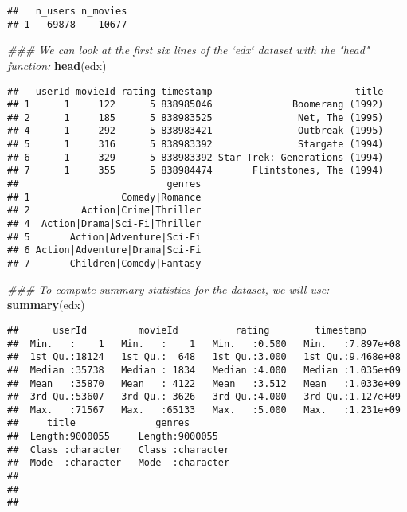 \documentclass[]{article}
\newenvironment{Shaded}{\begin{snugshade}}{\end{snugshade}}
\newcommand{\CommentTok}[1]{\textcolor[rgb]{0.56,0.35,0.01}{\textit{#1}}}
\newcommand{\DataTypeTok}[1]{\textcolor[rgb]{0.13,0.29,0.53}{#1}}
\newcommand{\KeywordTok}[1]{\textcolor[rgb]{0.13,0.29,0.53}{\textbf{#1}}}
\newcommand{\NormalTok}[1]{#1}
\newcommand{\OperatorTok}[1]{\textcolor[rgb]{0.81,0.36,0.00}{\textbf{#1}}}
\begin{document}
\begin{Shaded}
\end{Shaded}

\begin{verbatim}
##   n_users n_movies
## 1   69878    10677
\end{verbatim}

\begin{Shaded}
\begin{Highlighting}[]
\CommentTok{### We can look at the first six lines of the `edx` dataset with the "head" function:}
\KeywordTok{head}\NormalTok{(edx)}
\end{Highlighting}
\end{Shaded}

\begin{verbatim}
##   userId movieId rating timestamp                         title
## 1      1     122      5 838985046              Boomerang (1992)
## 2      1     185      5 838983525               Net, The (1995)
## 4      1     292      5 838983421               Outbreak (1995)
## 5      1     316      5 838983392               Stargate (1994)
## 6      1     329      5 838983392 Star Trek: Generations (1994)
## 7      1     355      5 838984474       Flintstones, The (1994)
##                          genres
## 1                Comedy|Romance
## 2         Action|Crime|Thriller
## 4  Action|Drama|Sci-Fi|Thriller
## 5       Action|Adventure|Sci-Fi
## 6 Action|Adventure|Drama|Sci-Fi
## 7       Children|Comedy|Fantasy
\end{verbatim}

\begin{Shaded}
\begin{Highlighting}[]
\CommentTok{### To compute summary statistics for the dataset, we will use:}
\KeywordTok{summary}\NormalTok{(edx)}
\end{Highlighting}
\end{Shaded}

\begin{verbatim}
##      userId         movieId          rating        timestamp        
##  Min.   :    1   Min.   :    1   Min.   :0.500   Min.   :7.897e+08  
##  1st Qu.:18124   1st Qu.:  648   1st Qu.:3.000   1st Qu.:9.468e+08  
##  Median :35738   Median : 1834   Median :4.000   Median :1.035e+09  
##  Mean   :35870   Mean   : 4122   Mean   :3.512   Mean   :1.033e+09  
##  3rd Qu.:53607   3rd Qu.: 3626   3rd Qu.:4.000   3rd Qu.:1.127e+09  
##  Max.   :71567   Max.   :65133   Max.   :5.000   Max.   :1.231e+09  
##     title              genres         
##  Length:9000055     Length:9000055    
##  Class :character   Class :character  
##  Mode  :character   Mode  :character  
##                                       
##                                       
## 
\end{verbatim}
\end{document}
